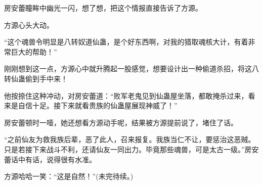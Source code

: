 \begin{this_body}
房安蕾瞳眸中幽光一闪，想了想，把这个情报直接告诉了方源。

方源心头大动。

“这个魂兽令明显是八转奴道仙蛊，是个好东西啊，对我的猎取魂核大计，有着非常巨大的帮助！”

刚刚想到这一点，方源心中就升腾起一股感觉，想要设计出一种偷道杀招，将这八转仙蛊偷到手中来！

他按捺住这种冲动，对房安蕾道：“败军老鬼见到仙蛊屋坐落，都敢掩杀过来，看来是自信十足。接下来就看贵族的仙蛊屋展现神威了！”

房安蕾顿时一噎，她还想看方源动手呢，结果被方源提前说了，堵住了话。

“之前仙友为救我族后辈，恶了此人，召来报复。我族当仁不让，要惩治这恶贼。只是若接下来战斗不利，还请仙友一同出力。毕竟那些魂兽，可是太古一级。”房安蕾话中有话，说得很有水准。

方源哈哈一笑：“这是自然！”(未完待续。)

\end{this_body}

